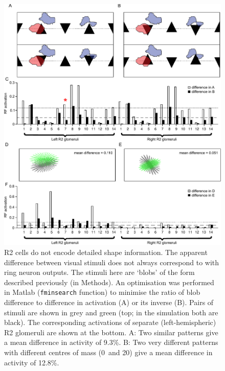 \begin{figure}
\centering
\includegraphics{figures/simdiffpatts}
\caption{R2 cells do not encode detailed shape information.
The apparent difference between visual stimuli does not always correspond to with ring neuron outputs.
The stimuli here are `blobs' of the form described previously (in Methods).
An optimisation was performed in Matlab (\texttt{fminsearch} function) to minimise the ratio of blob difference to difference in activation (A) or its inverse (B).
Pairs of stimuli are shown in grey and green (top; in the simulation both are black).
The corresponding activations of separate (left-hemispheric) R2 glomeruli are shown at the bottom.
A: Two similar patterns give a mean difference in activity of 9.3\%.
B: Two very different patterns with different centres of mass (0\degree\ and 20\degree) give a mean difference in activity of 12.8\%.
}

\label{fig:simdiffpatts}
\end{figure}